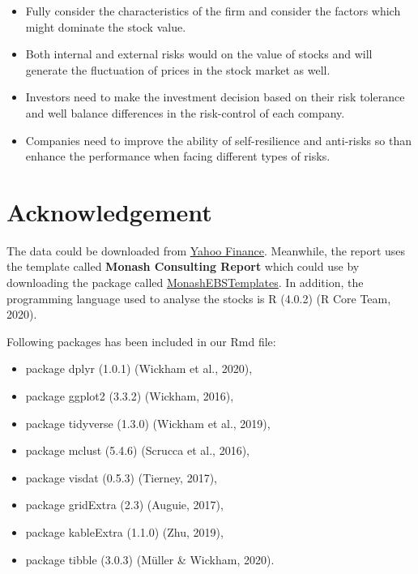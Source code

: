 \documentclass[11pt,a4paper,]{article}
\providecommand{\tightlist}{%
  \setlength{\itemsep}{0pt}\setlength{\parskip}{0pt}}
\begin{document}
\begin{itemize}
\tightlist
\item
  Fully consider the characteristics of the firm and consider the factors which might dominate the stock value.
\item
  Both internal and external risks would on the value of stocks and will generate the fluctuation of prices in the stock market as well.
\item
  Investors need to make the investment decision based on their risk tolerance and well balance differences in the risk-control of each company.
\item
  Companies need to improve the ability of self-resilience and anti-risks so than enhance the performance when facing different types of risks.
\end{itemize}

\clearpage

\hypertarget{acknowledgement}{%
\section{Acknowledgement}\label{acknowledgement}}

The data could be downloaded from \href{https://au.finance.yahoo.com/}{Yahoo Finance}. Meanwhile, the report uses the template called \textbf{Monash Consulting Report} which could use by downloading the package called \href{https://github.com/robjhyndman/MonashEBSTemplates}{MonashEBSTemplates}. In addition, the programming language used to analyse the stocks is R (4.0.2) (R Core Team, 2020).

Following packages has been included in our Rmd file:

\begin{itemize}
\tightlist
\item
  package dplyr (1.0.1) (Wickham et al., 2020),
\item
  package ggplot2 (3.3.2) (Wickham, 2016),
\item
  package tidyverse (1.3.0) (Wickham et al., 2019),
\item
  package mclust (5.4.6) (Scrucca et al., 2016),
\item
  package visdat (0.5.3) (Tierney, 2017),
\item
  package gridExtra (2.3) (Auguie, 2017),
\item
  package kableExtra (1.1.0) (Zhu, 2019),
\item
  package tibble (3.0.3) (Müller \& Wickham, 2020).
\end{itemize}
\end{document}
